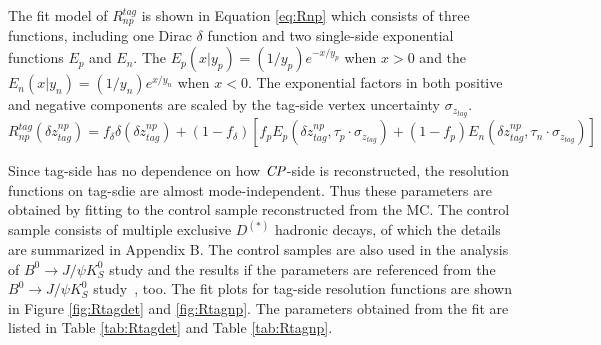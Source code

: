 The fit model of $R_{np}^{tag}$ is shown in Equation \ref{eq:Rnp} which consists of three functions, including one Dirac $\delta$ function and two single-side exponential functions $E_p$ and $E_n$. The $E_p(x|y_p)=(1/y_p)e^{-x/y_p} $ when $x > 0$ and the $E_n(x|y_n)=(1/y_n)e^{x/y_n} $ when $x < 0$.
The exponential factors in both positive and negative components are scaled by the tag-side vertex uncertainty $\sigma_{z_{tag}}$. 
\begin{equation}\label{eq:Rnp}
R_{np}^{tag}(\delta z_{tag}^{np})=f_{\delta}\delta(\delta z_{tag}^{np}) + 
(1-f_{\delta})[f_p E_p(\delta z_{tag}^{np},\tau_p\cdot \sigma_{z_{tag}}) +
(1-f_p)E_n(\delta z_{tag}^{np},\tau_n\cdot \sigma_{z_{tag}}) ]
\end{equation} 


Since tag-side has no dependence on how $\it{CP}$-side is reconstructed, the resolution functions on tag-sdie are almost mode-independent. Thus these parameters are obtained by fitting to the control sample reconstructed from the MC. The control sample consists of multiple exclusive $D^{(*)}$ hadronic decays, of which the details are summarized in Appendix B. The control samples are also used in the analysis of $B^0\to J/\psi K^0_S$ study and the results if the parameters are referenced from the $B^0\to J/\psi K^0_S$ study~\cite{jpsiks_ichep}, too. The fit plots for tag-side resolution functions are shown in Figure \ref{fig:Rtagdet} and \ref{fig:Rtagnp}. The parameters obtained from the fit are listed in Table \ref{tab:Rtagdet} and Table \ref{tab:Rtagnp}.


